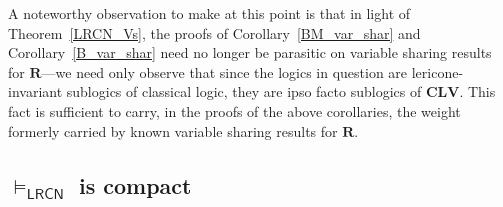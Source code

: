 \documentclass{amsart}
\theoremstyle{definition}
\newcommand{\LRCN}{\mathsf{LRCN}}
\newcommand{\CLV}{\mathbf{CLV}}
\begin{document}
A noteworthy observation to make at this point is that in light of Theorem~\ref{LRCN_Vs}, the proofs of Corollary~\ref{BM_var_shar} and Corollary~\ref{B_var_shar} need no longer be parasitic on variable sharing results for $\mathbf{R}$---we need only observe that since the logics in question are lericone-invariant sublogics of classical logic, they are ipso facto sublogics of $\CLV$. This fact is sufficient to carry, in the proofs of the above corollaries, the weight formerly carried by known variable sharing results for $\mathbf{R}$. 



    \subsection{$\vDash_{\LRCN}$ is compact}
\end{document}
